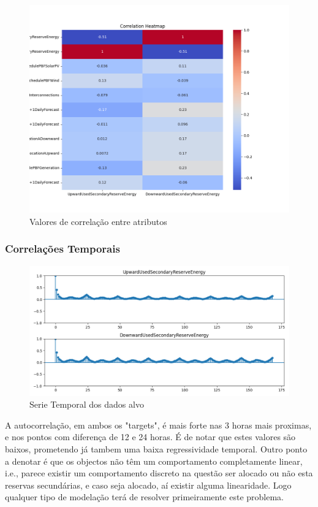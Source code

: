 \begin{figure}[H]
  \centering
  \includegraphics[width=\textwidth]{../plots/correlation_heatmap.png}
  \caption{Valores de correlação entre atributos}
\end{figure}

\subsubsection{Correlações Temporais}

\begin{figure}[H]
  \centering
  \includegraphics[width=\textwidth]{../plots/autocorrelation.png}
  \caption{Serie Temporal dos dados alvo}
\end{figure}


A autocorrelação, em ambos os "targets", é mais forte nas 3 horas mais proximas, e nos pontos com diferença de 12 e 24 horas.
É de notar que estes valores são baixos, prometendo já tambem uma baixa regressividade temporal.
Outro ponto a denotar é que os objectos não têm um comportamento completamente linear, i.e., parece existir um comportamento discreto na questão ser alocado ou não esta reservas secundárias, e caso seja alocado, aí existir alguma linearidade.
Logo qualquer tipo de modelação terá de resolver primeiramente este problema.

